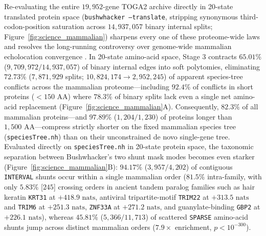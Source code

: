 \documentclass[11pt,a4paper]{article}
\begin{document}
Re-evaluating the entire $19,952$-gene TOGA2 archive directly in 20-state translated protein space (\texttt{bushwhacker --translate}, stripping synonymous third-codon-position saturation across $14,937,057$ binary internal splits; Figure~\ref{fig:science_mammalian}) sharpens every one of these proteome-wide laws and resolves the long-running controversy over genome-wide mammalian echolocation convergence \citep{parker2013genome,zou2015no,thomas2015molecular}. In 20-state amino-acid space, Stage 3 contracts $65.01\%$ ($9,709,972 / 14,937,057$) of binary internal edges into soft polytomies, eliminating $72.73\%$ ($7,871,929$ splits; $10,824,174 \to 2,952,245$) of apparent species-tree conflicts across the mammalian proteome---including $92.4\%$ of conflicts in short proteins ($<150\text{ AA}$) where $78.3\%$ of binary splits lack even a single net amino-acid replacement (Figure~\ref{fig:science_mammalian}A). Consequently, $82.3\%$ of all mammalian proteins---and $97.89\%$ ($1,204 / 1,230$) of proteins longer than $1,500\text{ AA}$---compress strictly shorter on the fixed mammalian species tree (\texttt{speciesTree.nh}) than on their unconstrained de novo single-gene tree. Evaluated directly on \texttt{speciesTree.nh} in 20-state protein space, the taxonomic separation between Bushwhacker's two shunt mask modes becomes even starker (Figure~\ref{fig:science_mammalian}B): $94.17\%$ ($3,957 / 4,202$) of contiguous \texttt{INTERVAL} shunts occur within a single mammalian order ($81.5\%$ intra-family, with only $5.83\%$ [$245$] crossing orders in ancient tandem paralog families such as hair keratin \texttt{KRT31} at $+418.9\text{ nats}$, antiviral tripartite-motif \texttt{TRIM22} at $+313.5\text{ nats}$ and \texttt{TRIM6} at $+251.3\text{ nats}$, \texttt{ZNF33A} at $+271.2\text{ nats}$, and guanylate-binding \texttt{GBP2} at $+226.1\text{ nats}$), whereas $45.81\%$ ($5,366 / 11,713$) of scattered \texttt{SPARSE} amino-acid shunts jump across distinct mammalian orders ($7.9\times$ enrichment, $p < 10^{-300}$).
\end{document}
